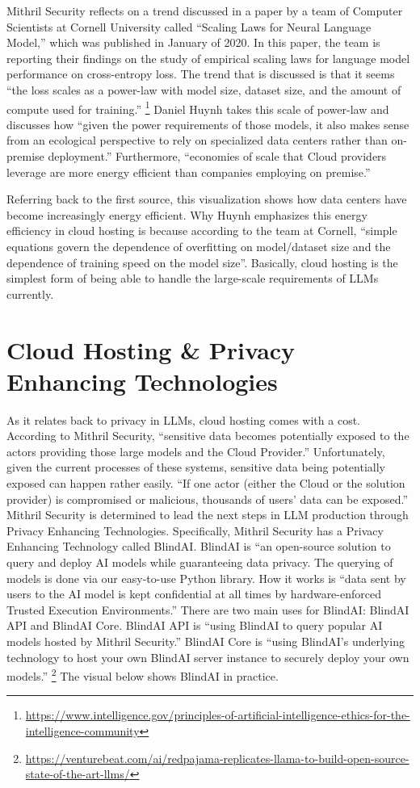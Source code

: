 \documentclass[
]{book}
\begin{document}
Mithril Security reflects on a trend discussed in a paper by a team of Computer Scientists at Cornell University called ``Scaling Laws for Neural Language Model,'' which was published in January of 2020. In this paper, the team is reporting their findings on the study of empirical scaling laws for language model performance on cross-entropy loss. The trend that is discussed is that it seems ``the loss scales as a power-law with model size, dataset size, and the amount of compute used for training.'' \footnote{\url{https://www.intelligence.gov/principles-of-artificial-intelligence-ethics-for-the-intelligence-community}} Daniel Huynh takes this scale of power-law and discusses how ``given the power requirements of those models, it also makes sense from an ecological perspective to rely on specialized data centers rather than on-premise deployment.'' Furthermore, ``economies of scale that Cloud providers leverage are more energy efficient than companies employing on premise.''

Referring back to the first source, this visualization shows how data centers have become increasingly energy efficient. Why Huynh emphasizes this energy efficiency in cloud hosting is because according to the team at Cornell, ``simple equations govern the dependence of overfitting on model/dataset size and the dependence of training speed on the model size''. Basically, cloud hosting is the simplest form of being able to handle the large-scale requirements of LLMs currently.

\hypertarget{cloud-hosting-privacy-enhancing-technologies}{%
\section{Cloud Hosting \& Privacy Enhancing Technologies}\label{cloud-hosting-privacy-enhancing-technologies}}

As it relates back to privacy in LLMs, cloud hosting comes with a cost. According to Mithril Security, ``sensitive data becomes potentially exposed to the actors providing those large models and the Cloud Provider.'' Unfortunately, given the current processes of these systems, sensitive data being potentially exposed can happen rather easily. ``If one actor (either the Cloud or the solution provider) is compromised or malicious, thousands of users' data can be exposed.'' Mithril Security is determined to lead the next steps in LLM production through Privacy Enhancing Technologies. Specifically, Mithril Security has a Privacy Enhancing Technology called BlindAI. BlindAI is ``an open-source solution to query and deploy AI models while guaranteeing data privacy. The querying of models is done via our easy-to-use Python library. How it works is ``data sent by users to the AI model is kept confidential at all times by hardware-enforced Trusted Execution Environments.'' There are two main uses for BlindAI: BlindAI API and BlindAI Core. BlindAI API is ``using BlindAI to query popular AI models hosted by Mithril Security.'' BlindAI Core is ``using BlindAI's underlying technology to host your own BlindAI server instance to securely deploy your own models.'' \footnote{\url{https://venturebeat.com/ai/redpajama-replicates-llama-to-build-open-source-state-of-the-art-llms/}} The visual below shows BlindAI in practice.
\end{document}
